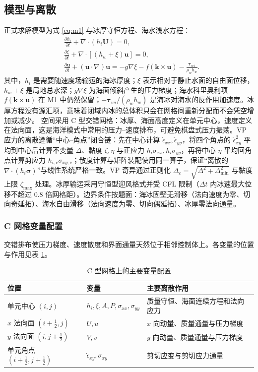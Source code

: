 \documentclass[UTF8,fontset=none]{ctexart}
\newcommand{\vect}[1]{\boldsymbol{#1}}
\begin{document}
\subsection{模型与离散}

正式求解模型为式 \eqref{eq:m1} 与冰厚守恒方程、海水浅水方程：
\begin{align}
&\frac{\partial h_i}{\partial t}+\nabla\cdot(h_i\vect U)=0,\\
&\frac{\partial\xi}{\partial t}+\nabla\cdot[(h_w+\xi)\vect u]=0,\\
&\frac{\partial\vect u}{\partial t}+(\vect u\cdot\nabla)\vect u
=-g\nabla\xi-f(\vect k\times\vect u)-\frac{\vect\tau_{wi}}{\rho_wh_w}.
\end{align}
其中，$h_i$ 是需要随速度场输运的海冰厚度；$\xi$ 表示相对于静止水面的自由面位移，$h_w+\xi$ 是局地总水深；$g\nabla\xi$ 为海面倾斜产生的压力梯度；海水科里奥利项 $f(\vect k\times\vect u)$ 在 M1 中仍然保留；$-\vect\tau_{wi}/(\rho_wh_w)$ 是海冰对海水的反作用加速度。冰厚方程没有源汇项，意味着闭域内冰的总体积只会在网格间重新分配而不会凭空增加或减少。
空间采用 C 型交错网格：冰厚、海面高度定义在单元中心，速度定义在法向面，这是海洋模式中常用的压力--速度排布\cite{arakawa1977}，可避免棋盘式压力振荡。VP 应力的离散遵循“中心--角点”闭合链：先在中心计算 $\dot\epsilon_{xx},\dot\epsilon_{yy}$，将四个角点的 $\dot\epsilon_{xy}^2$ 平均到中心后计算不变量 $\Delta$、黏度 $\zeta,\eta$ 与正应力 $h_i\sigma_{xx},h_i\sigma_{yy}$，再将中心 $\eta$ 平均回角点计算剪应力 $h_{i,c}\sigma_{xy,c}$；散度计算与矩阵装配使用同一算子，保证“离散的 $\nabla\cdot(h_i\vect\sigma)$”与线性系统严格一致。VP 奇异通过正则化 $\Delta_\varepsilon=\sqrt{\Delta^2+\Delta_{\min}^2}$ 与黏度上限 $\zeta_{\max}$ 处理。冰厚输运采用守恒型迎风格式并受 CFL 限制（$\Delta t$ 内冰速最大位移不超过 0.8 倍网格距）。边界条件按题面：海冰固壁无滑移（法向速度为零、切向奇延拓）、海水自由滑移（法向速度为零、切向偶延拓）、冰厚零法向通量。

\subsubsection{C 网格变量配置}

交错排布使压力梯度、速度散度和界面通量天然位于相邻控制体上。各变量的位置与作用见表 \ref{tab:cgrid}。

\begin{table}[H]
\centering
\caption{C 型网格上的主要变量配置}
\renewcommand{\arraystretch}{1.35}
\begin{tabular*}{\textwidth}{@{\extracolsep{\fill}}lll@{}}
\toprule[1pt]
位置 & 变量 & 主要离散作用\\
\midrule
单元中心 $(i,j)$ & $h_i,\xi,A,P,\sigma_{xx},\sigma_{yy}$ & 质量守恒、海面连续方程和法向应力\\
$x$ 法向面 $(i+\tfrac12,j)$ & $U,u$ & $x$ 向动量、质量通量与压力梯度\\
$y$ 法向面 $(i,j+\tfrac12)$ & $V,v$ & $y$ 向动量、质量通量与压力梯度\\
单元角点 $(i+\tfrac12,j+\tfrac12)$ & $\dot\epsilon_{xy},\sigma_{xy}$ & 剪切应变与剪切应力通量\\
\bottomrule[1pt]
\end{tabular*}
\label{tab:cgrid}
\end{table}
\end{document}
